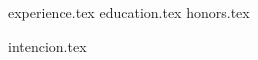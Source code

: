 \documentclass[11pt, a4paper]{awesome-cv}
\newcommand*{\sectiondir}{resume/}
\begin{document}
\makecvheader

{experience.tex}
{education.tex}
{honors.tex}

\newpage
{intencion.tex}
\end{document}
